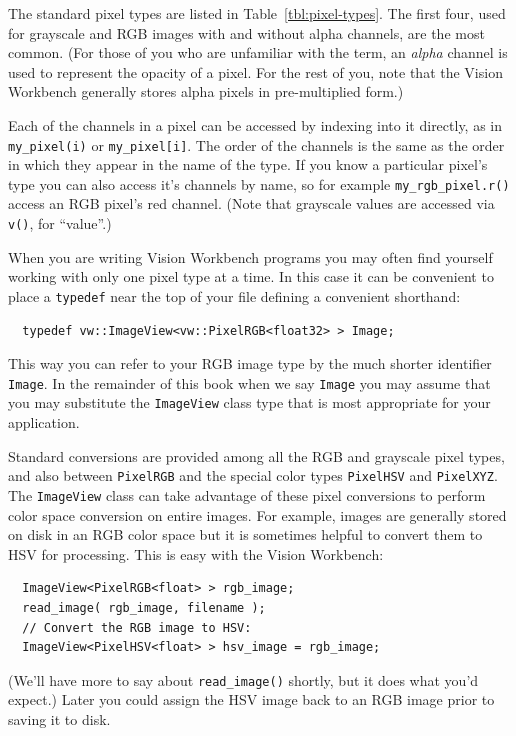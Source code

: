 The standard pixel types are listed in Table~\ref{tbl:pixel-types}.
The first four, used for grayscale and RGB images with and without
alpha channels, are the most common.  (For those of you who are 
unfamiliar with the term, an {\it alpha} channel is used to represent 
the opacity of a pixel.  For the rest of you, note that the Vision 
Workbench generally stores alpha pixels in pre-multiplied form.)

Each of the channels in a pixel can be accessed by indexing into it
directly, as in \verb#my_pixel(i)# or \verb#my_pixel[i]#.  The order 
of the channels is the same as the order in which they appear in the 
name of the type.  If you know a particular pixel's type you can also 
access it's channels by name, so for example \verb#my_rgb_pixel.r()# 
access an RGB pixel's red channel.  (Note that grayscale values are 
accessed via \verb#v()#, for ``value''.)

When you are writing Vision Workbench programs you may often find 
yourself working with only one pixel type at a time.  In this case 
it can be convenient to place a \verb#typedef# near the top of your 
file defining a convenient shorthand:
\begin{verbatim}
  typedef vw::ImageView<vw::PixelRGB<float32> > Image;
\end{verbatim}
This way you can refer to your RGB image type by the much shorter
identifier \verb#Image#.  In the remainder of this book when we say
\verb#Image# you may assume that you may substitute the
\verb#ImageView# class type that is most appropriate for your
application.

Standard conversions are provided among all the RGB and grayscale pixel 
types, and also between \verb#PixelRGB# and the special color types 
\verb#PixelHSV# and \verb#PixelXYZ#.  The \verb#ImageView# class can 
take advantage of these pixel conversions to perform color space 
conversion on entire images.  For example, images are generally stored 
on disk in an RGB color space but it is sometimes helpful to convert 
them to HSV for processing.  This is easy with the Vision Workbench:
\begin{verbatim}
  ImageView<PixelRGB<float> > rgb_image;
  read_image( rgb_image, filename );
  // Convert the RGB image to HSV:
  ImageView<PixelHSV<float> > hsv_image = rgb_image;
\end{verbatim}
(We'll have more to say about \verb#read_image()# shortly, but it 
does what you'd expect.)  Later you could assign the HSV image back 
to an RGB image prior to saving it to disk.

